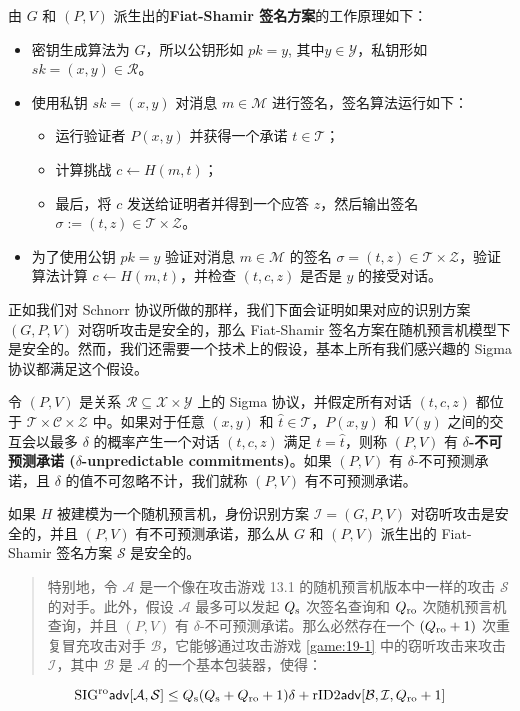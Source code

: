 由 $G$ 和 $(P, V)$ 派生出的\textbf{Fiat-Shamir 签名方案}的工作原理如下：
\begin{itemize}
	\item 密钥生成算法为 $G$，所以公钥形如 $pk=y$, 其中$y\in\mathcal{Y}$，私钥形如 $sk=(x,y)\in\mathcal{R}$。
	\item 使用私钥 $sk = (x, y)$ 对消息 $m\in\mathcal{M}$ 进行签名，签名算法运行如下：
	\begin{itemize}
		\item 运行验证者 $P(x,y)$ 并获得一个承诺 $t\in\mathcal{T}$；
		\item 计算挑战 $c\leftarrow H(m,t)$；
		\item 最后，将 $c$ 发送给证明者并得到一个应答 $z$，然后输出签名 $\sigma:=(t,z)\in\mathcal{T}\times\mathcal{Z}$。
	\end{itemize}
	\item 为了使用公钥 $pk=y$ 验证对消息 $m\in\mathcal{M}$ 的签名 $\sigma=(t,z)\in\mathcal{T}\times\mathcal{Z}$，验证算法计算 $c\leftarrow H(m,t)$，并检查 $(t,c,z)$ 是否是 $y$ 的接受对话。
\end{itemize}

正如我们对 Schnorr 协议所做的那样，我们下面会证明如果对应的识别方案 $(G,P,V)$ 对窃听攻击是安全的，那么 Fiat-Shamir 签名方案在随机预言机模型下是安全的。然而，我们还需要一个技术上的假设，基本上所有我们感兴趣的 Sigma 协议都满足这个假设。

\begin{definition}[不可预测承诺]\label{def:19-7}
令 $(P,V)$ 是关系 $\mathcal{R}\subseteq\mathcal{X}×\mathcal{Y}$ 上的 Sigma 协议，并假定所有对话 $(t,c,z)$ 都位于 $\mathcal{T}\times\mathcal{C}\times\mathcal{Z}$ 中。如果对于任意 $(x,y)$ 和 $\hat t\in\mathcal{T}$，$P(x,y)$ 和 $V(y)$ 之间的交互会以最多 $\delta$ 的概率产生一个对话 $(t,c,z)$ 满足 $t=\hat t$，则称 $(P,V)$ 有 \textbf{$\delta$-不可预测承诺 ($\delta$-unpredictable commitments)}。如果 $(P,V)$ 有 $\delta$-不可预测承诺，且 $\delta$ 的值不可忽略不计，我们就称 $(P,V)$ 有不可预测承诺。
\end{definition}

\begin{theorem}\label{theo:19-16}
如果 $H$ 被建模为一个随机预言机，身份识别方案 $\mathcal{I}=(G,P,V)$ 对窃听攻击是安全的，并且 $(P,V)$ 有不可预测承诺，那么从 $G$ 和 $(P, V)$ 派生出的 Fiat-Shamir 签名方案 $\mathcal{S}$ 是安全的。
\begin{quote}
	特别地，令 $\mathcal{A}$ 是一个像在攻击游戏 13.1 的随机预言机版本中一样的攻击 $\mathcal{S}$ 的对手。此外，假设 $\mathcal{A}$ 最多可以发起 $Q_{\rm s}$ 次签名查询和 $Q_{\rm ro}$ 次随机预言机查询，并且 $(P, V)$ 有 $\delta$-不可预测承诺。那么必然存在一个 $(Q_{\rm ro}+1)$ 次重复冒充攻击对手 $\mathcal{B}$，它能够通过攻击游戏 \ref{game:19-1} 中的窃听攻击来攻击 $\mathcal{I}$，其中 $\mathcal{B}$ 是 $\mathcal{A}$ 的一个基本包装器，使得：
\end{quote}
$$
{\rm SIG^{ro}\mathsf{adv}}[\mathcal{A},\mathcal{S}]\leq Q_{\rm s}(Q_{\rm s}+Q_{\rm ro}+1)\delta+{\rm rID2\mathsf{adv}}[\mathcal{B},\mathcal{I},Q_{\rm ro}+1]
$$
\end{theorem}

